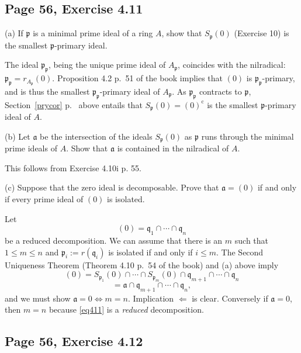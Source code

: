 \documentclass[parskip=half,fontsize=12pt]{scrartcl}%
\newcommand{\oo}{\operatorname}\newcommand{\ooo}{\operatorname*}
\newcommand{\mf}{\mathfrak}
\newcommand{\aaa}{\mf a}
\newcommand{\ppp}{\mf p}
\newcommand{\qqq}{\mf q}
\begin{document}
\subsection{Page 56, Exercise 4.11}\label{411}%

(a) If $\ppp$ is a minimal prime ideal of a ring $A$, show that $S_\ppp(0)$ (Exercise 10) is the smallest $\ppp$-primary ideal.

The ideal $\ppp_\ppp$, being the unique prime ideal of $A_\ppp$, coincides with the nilradical: $\ppp_\ppp=r_{A_\ppp}(0)$. Proposition 4.2 p.~51 of the book implies that $(0)$ is $\ppp_\ppp$-primary, and is thus the smallest $\ppp_\ppp$-primary ideal of $A_\ppp$. As $\ppp_\ppp$ contracts to $\ppp$, Section~\ref{prycor} p.~\pageref{prycor} above entails that $S_\ppp(0)=(0)^{\oo c}$ is the smallest $\ppp$-primary ideal of $A$. %

(b) Let $\aaa$ be the intersection of the ideals $S_\ppp(0)$ as  $\ppp$ runs through the minimal prime ideals of $A$. Show that $\aaa$ is contained in the nilradical of $A$.

This follows from Exercise 4.10i p. 55.

(c) Suppose that the zero ideal is decomposable. Prove that $\aaa=(0)$ if and only if every prime ideal of $(0)$ is isolated.

Let 
$$
(0)=\qqq_1\cap\cdots\cap\qqq_n
$$ 
be a reduced decomposition. We can assume that there is an $m$ such that $1\le m\le n$ and $\ppp_i:=r(\qqq_i)$ is isolated if and only if $i\le m$. The Second Uniqueness Theorem (Theorem 4.10 p.~54 of the book) and (a) above imply 
\begin{equation}\label{eq411}
(0)=S_{\ppp_1}(0)\cap\cdots\cap S_{\ppp_m}(0)\cap\qqq_{m+1}\cap\cdots\cap\qqq_n
\end{equation} 
$$
=\aaa\cap\qqq_{m+1}\cap\cdots\cap\qqq_n,
$$ 
and we must show $\aaa=0\iff m=n$. Implication $\Longleftarrow$ is clear. Conversely if $\aaa=0$, then $m=n$ because \eqref{eq411} is a \emph{reduced} decomposition.

\subsection{Page 56, Exercise 4.12}%
\end{document}
